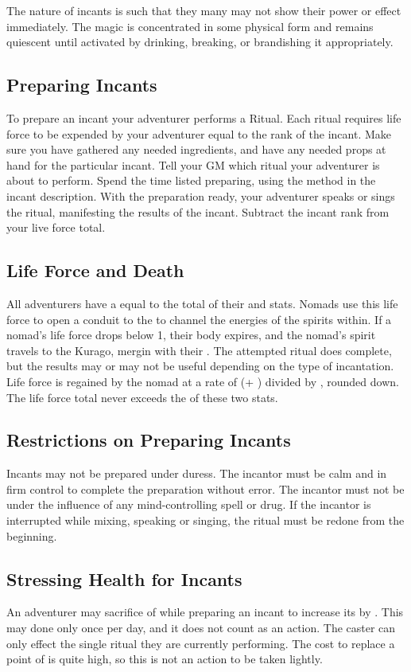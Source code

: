 \begin{multicols*}{2}
The nature of incants is such that they many may not show their power or effect immediately. The magic is concentrated in some physical form and remains quiescent until activated by drinking, breaking, or brandishing it appropriately.
\subsection{Preparing Incants}
To prepare an incant your adventurer performs a Ritual. Each ritual requires life force to be expended by your adventurer equal to the rank of the incant. Make sure you have gathered any needed ingredients, and have any needed props at hand for the particular incant. Tell your GM which ritual your adventurer is about to perform. Spend the time listed preparing, using the method in the incant description. With the preparation ready, your adventurer speaks or sings the ritual, manifesting the results of the incant. Subtract the incant rank from your live force total.
\subsection{Life Force and Death}
All adventurers have a  equal to the total of their \HEA and \PER stats. Nomads use this life force to open a conduit to the  to channel the energies of the spirits within. If a nomad's life force drops below 1, their body expires, and the nomad's spirit travels to the Kurago, mergin with their . The attempted ritual does complete, but the results may or may not be useful depending on the type of incantation. Life force is regained by the nomad at a rate of (\HEA + \PER) divided by , rounded down. The life force total never exceeds the  of these two stats.
\subsection{Restrictions on Preparing Incants}
Incants may not be prepared under duress. The incantor must be calm and in firm control to complete the preparation without error. The incantor must not be under the influence of any mind-controlling spell or drug. If the incantor is interrupted while mixing, speaking or singing, the ritual must be redone from the beginning.
\subsection{Stressing Health for Incants}
An adventurer may sacrifice  of \HEA while preparing an incant to increase its  by . This may done only once per day, and it does not count as an action. The caster can only effect the single ritual they are currently performing. The cost to replace a point of \HEA is quite high, so this is not an action to be taken lightly.

\end{multicols*}
